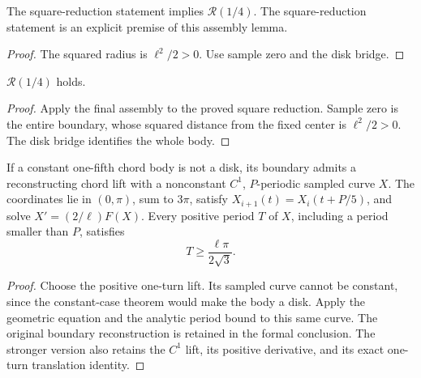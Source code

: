 \begin{lemma}
\label{lem:quarter-assembly}
\leanok
{}
The square-reduction statement implies $\mathcal R(1/4)$.
The square-reduction statement is an explicit premise of this assembly lemma.
\end{lemma}
\begin{proof}
\leanok
The squared radius is $\ell^2/2>0$. Use sample zero and the disk bridge.
\end{proof}

\begin{theorem}
\label{thm:quarter}
\leanok
{}
$\mathcal R(1/4)$ holds.
\end{theorem}
\begin{proof}
\leanok
Apply the final assembly to the proved square reduction. Sample zero is
the entire boundary, whose squared distance from the fixed center is
$\ell^2/2>0$. The disk bridge identifies the whole body.
\end{proof}

\begin{proposition}
\label{prop:pentagon-counterexample}
\leanok
{}
If a constant one-fifth chord body is not a disk, its boundary admits a
reconstructing chord lift with a nonconstant $C^1$, $P$-periodic sampled
curve $X$. The coordinates lie in $(0,\pi)$, sum to $3\pi$, satisfy
$X_{i+1}(t)=X_i(t+P/5)$, and solve $X'=(2/\ell)F(X)$.
Every positive period $T$ of $X$, including a period smaller than $P$,
satisfies
\[
 T\geq\frac{\ell\pi}{2\sqrt3}.
\]
\end{proposition}
\begin{proof}
\leanok
Choose the positive one-turn lift. Its sampled curve cannot be constant,
since the constant-case theorem would make the body a disk. Apply the
geometric equation and the analytic period bound to this same curve.
The original boundary reconstruction is retained in the formal conclusion.
The stronger version also retains the $C^1$ lift, its positive derivative,
and its exact one-turn translation identity.
\end{proof}

